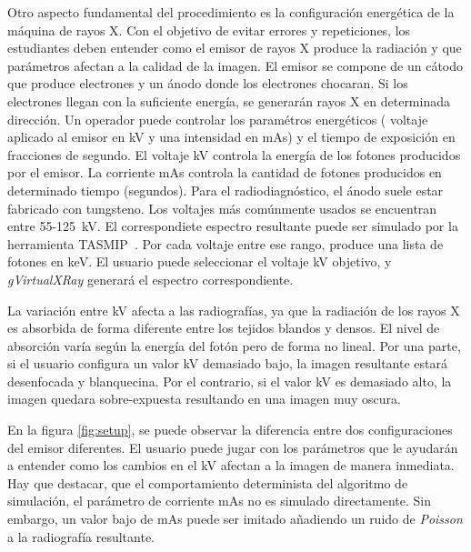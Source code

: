 Otro aspecto fundamental del procedimiento es la configuración energética de la máquina de rayos X. Con el objetivo de evitar errores y repeticiones, los estudiantes deben entender como el emisor de rayos X produce la radiación y que parámetros afectan a la calidad de la imagen. El emisor se compone de un cátodo que produce electrones y un ánodo donde los electrones chocaran. Si los electrones llegan con la suficiente energía, se generarán rayos X en determinada dirección. Un operador puede controlar los paramétros energéticos ( voltaje aplicado al emisor en \ac{kV} y una intensidad en \ac{mAs}) y el tiempo de exposición en fracciones de segundo. El voltaje \ac{kV} controla la energía de los fotones producidos por el emisor. La corriente \ac{mAs} controla la cantidad de fotones producidos en determinado tiempo (segundos). 
Para el radiodiagnóstico, el ánodo suele estar fabricado con tungsteno. Los voltajes más comúnmente usados se encuentran entre 55-125~\ac{kV}. El correspondiete espectro resultante puede ser simulado por la herramienta \ac{TASMIP}~\cite{Boone1997}. Por cada voltaje entre ese rango, produce una lista de fotones en \ac{keV}. El usuario puede seleccionar el voltaje \ac{kV} objetivo, y \emph{gVirtualXRay} generará el espectro correspondiente.

La variación entre \ac{kV} afecta a las radiografías, ya que la radiación de los rayos X es absorbida de forma diferente entre los tejidos blandos y densos. El nivel de absorción varía según la energía del fotón pero de forma no lineal. 
Por una parte, si el usuario configura un valor \ac{kV} demasiado bajo, la imagen resultante estará desenfocada y blanquecina. Por el contrario, si el valor \ac{kV} es demasiado alto, la imagen quedara sobre-expuesta resultando en una imagen muy oscura.

En la figura \ref{fig:setup}, se puede observar la diferencia entre dos configuraciones del emisor diferentes. El usuario puede jugar con los parámetros que le ayudarán a entender como los cambios en el \ac{kV} afectan a la imagen de manera inmediata. Hay que destacar, que el comportamiento determinista del algoritmo de simulación, el parámetro de corriente \ac{mAs} no es simulado directamente. Sin embargo, un valor bajo de \ac{mAs} puede ser imitado añadiendo un ruido de \emph{Poisson} a la radiografía resultante.




